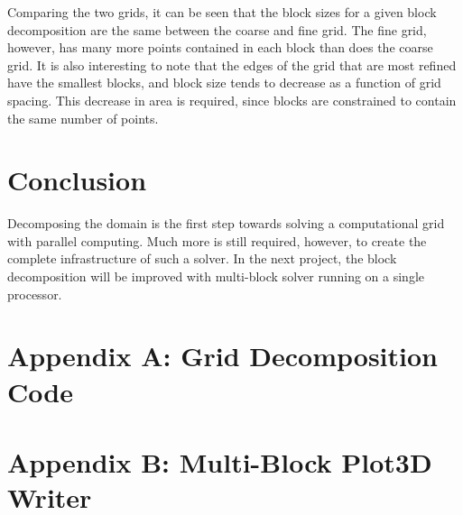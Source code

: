 \documentclass[twocolumn,10pt]{asme2ej}
\begin{document}
Comparing the two grids, it can be seen that the block sizes for a given block decomposition are the same between the coarse and fine grid.  The fine grid, however, has many more points contained in each block than does the coarse grid.  It is also interesting to note that the edges of the grid that are most refined have the smallest blocks, and block size tends to decrease as a function of grid spacing.  This decrease in area is required, since blocks are constrained to contain the same number of points.

\section{Conclusion}

Decomposing the domain is the first step towards solving a computational grid with parallel computing.  Much more is still required, however, to create the complete infrastructure of such a solver.  In the next project, the block decomposition will be improved with multi-block solver running on a single processor.









\onecolumn
\appendix       %

\section*{Appendix A: Grid Decomposition Code}


\clearpage

\section*{Appendix B: Multi-Block Plot3D Writer}

\end{document}

